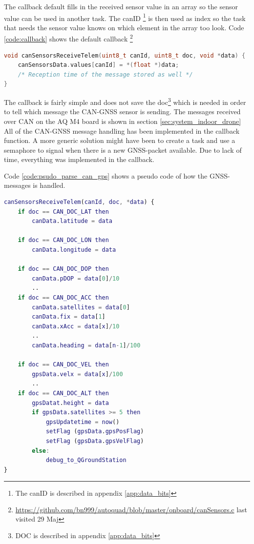 The callback default fills in the received sensor value in an array so the sensor value can be used in another task. The canID \footnote{The canID is described in appendix \ref{app:data_bits}} is then used as index so the task that needs the sensor value knows on which element in the array too look. Code \ref{code:callback} shows the default callback \footnote{\url{https://github.com/bn999/autoquad/blob/master/onboard/canSensors.c} last visited 29 Maj}
\begin{lstlisting}[language = c, caption = Callback invoked when a CAN-sensorvalue is received. It stores the value in an array indexed by canId. Note that the sensor value is casted to a float, label=code:callback]
void canSensorsReceiveTelem(uint8_t canId, uint8_t doc, void *data) {
    canSensorsData.values[canId] = *(float *)data;
	/* Reception time of the message stored as well */
}
\end{lstlisting}
The callback is fairly simple and does not save the doc\footnote{DOC is described in appendix \ref{app:data_bits}} which is needed in order to tell which message the CAN-GNSS sensor is sending. The messages received over CAN on the AQ M4 board is shown in section \ref{sec:system_indoor_drone}\\

All of the CAN-GNSS message handling has been implemented in the callback function. A more generic solution might have been to create a task and use a semaphore to signal when there is a new GNSS-packet available. Due to lack of time, everything was implemented in the callback.

Code \ref{code:psudo_parse_can_gps} shows a pseudo code of how the GNSS-messages is handled.

\begin{lstlisting}[language = Matlab, caption = Modified callback invoked when a sensor-value is received. Shows how DOC is used to tell which GNSS-message is received and when height is received the flags are set to update the \ac{UKF}, label=code:psudo_parse_can_gps]
canSensorsReceiveTelem(canId, doc, *data) {
	if doc == CAN_DOC_LAT then
		canData.latitude = data
		
	if doc == CAN_DOC_LON then
		canData.longitude = data
		
	if doc == CAN_DOC_DOP then
		canData.pDOP = data[0]/10
		..
	if doc == CAN_DOC_ACC then
		canData.satellites = data[0]
		canData.fix = data[1]
		canData.xAcc = data[x]/10
		..
		canData.heading = data[n-1]/100
		
	if doc == CAN_DOC_VEL then
		gpsData.velx = data[x]/100
		..		
	if doc == CAN_DOC_ALT then
		gpsDatat.height = data
		if gpsData.satellites >= 5 then
			gpsUpdatetime = now()
			setFlag (gpsData.gpsPosFlag)
			setFlag (gpsData.gpsVelFlag)
		else:
			debug_to_QGroundStation
}
\end{lstlisting}

